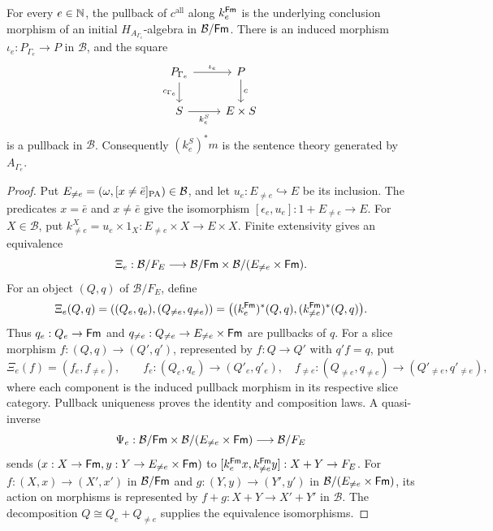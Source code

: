 \begin{proposition}
\label{prop:arithmetic-theory-fibers}
For every $e\in\mathbb N$, the pullback of $c^{\mathrm{all}}$ along
$k_e^{\mathsf{Fm}}$ is the underlying conclusion morphism of an initial
$H_{A_{\Gamma_e}}$-algebra in $\mathcal B/\mathsf{Fm}$.
There is an induced morphism $\iota_e:P_{\Gamma_e}\to P$
in $\mathcal B$, and the square
\[
\begin{tikzcd}
 P_{\Gamma_e}\arrow[r,"\iota_e"]
       \arrow[d,"c_{\Gamma_e}"'] & P\arrow[d,"c"]\\
 S\arrow[r,"k_e^S"'] & E\times S
\end{tikzcd}
\]
is a pullback in $\mathcal B$. Consequently
$(k_e^S)^*m$ is the sentence theory generated by $A_{\Gamma_e}$.
\end{proposition}
\begin{proof}
Put $E_{\ne e}=(\omega,[x\ne\bar e]_{\mathrm{PA}})\in\mathcal B$,
and let $u_e:E_{\ne e}\hookrightarrow E$ be its inclusion.
The predicates $x=\bar e$ and $x\ne\bar e$ give the
isomorphism $[\epsilon_e,u_e]:1+E_{\ne e}\to E$.
For $X\in\mathcal B$, put
$k_{\ne e}^X=u_e\times1_X:E_{\ne e}\times X\to E\times X$.
Finite extensivity gives an equivalence
\[
 \Xi_e:\mathcal B/F_E\longrightarrow
       \mathcal B/\mathsf{Fm}\times\mathcal B/(E_{\ne e}\times\mathsf{Fm}).
\]
For an object $(Q,q)$ of $\mathcal B/F_E$, define
\[
 \Xi_e(Q,q)=((Q_e,q_e),(Q_{\ne e},q_{\ne e}))
   =\bigl((k_e^{\mathsf{Fm}})^*(Q,q),(k_{\ne e}^{\mathsf{Fm}})^*(Q,q)\bigr).
\]
Thus $q_e:Q_e\to\mathsf{Fm}$ and
$q_{\ne e}:Q_{\ne e}\to E_{\ne e}\times\mathsf{Fm}$ are pullbacks
of $q$. For a slice morphism $f:(Q,q)\to(Q',q')$, represented
by $f:Q\to Q'$ with $q'f=q$, put
\[
 \Xi_e(f)=(f_e,f_{\ne e}),\qquad
 f_e:(Q_e,q_e)\to(Q'_e,q'_e),\quad
 f_{\ne e}:(Q_{\ne e},q_{\ne e})\to(Q'_{\ne e},q'_{\ne e}),
\]
where each component is the induced pullback morphism in its
respective slice category. Pullback uniqueness proves the
identity and composition laws.
A quasi-inverse
\[
 \Psi_e:\mathcal B/\mathsf{Fm}\times\mathcal B/(E_{\ne e}\times\mathsf{Fm})
                 \longrightarrow\mathcal B/F_E
\]
sends $(x:X\to\mathsf{Fm},y:Y\to E_{\ne e}\times\mathsf{Fm})$ to
$[k_e^{\mathsf{Fm}}x,k_{\ne e}^{\mathsf{Fm}}y]:X+Y\to F_E$.
For $f:(X,x)\to(X',x')$ in $\mathcal B/\mathsf{Fm}$ and
$g:(Y,y)\to(Y',y')$ in $\mathcal B/(E_{\ne e}\times\mathsf{Fm})$,
its action on morphisms is represented by
$f+g:X+Y\to X'+Y'$ in $\mathcal B$.
The decomposition $Q\cong Q_e+Q_{\ne e}$ supplies the
equivalence isomorphisms.


\end{proof}
